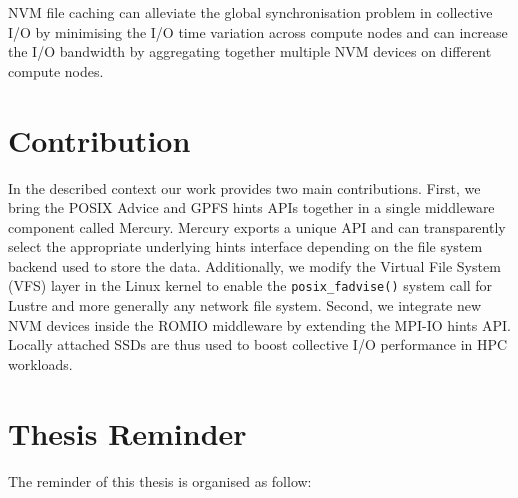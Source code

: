 NVM file caching can alleviate the global synchronisation problem in collective I/O by minimising the I/O time variation across compute nodes and can increase the I/O bandwidth by aggregating together multiple NVM devices on different compute nodes.

\section{Contribution} \label{sec: contribution}
In the described context our work provides two main contributions. First, we bring the POSIX Advice and GPFS hints APIs together in a single middleware component called Mercury. Mercury exports a unique API and can transparently select the appropriate underlying hints interface depending on the file system backend used to store the data. Additionally, we modify the Virtual File System (VFS) layer in the Linux kernel to enable the \texttt{posix\_fadvise()} system call for Lustre and more generally any network file system. Second, we integrate new NVM devices inside the ROMIO middleware by extending the MPI-IO hints API. Locally attached SSDs are thus used to boost collective I/O performance in HPC workloads.

\section{Thesis Reminder}
The reminder of this thesis is organised as follow: 
